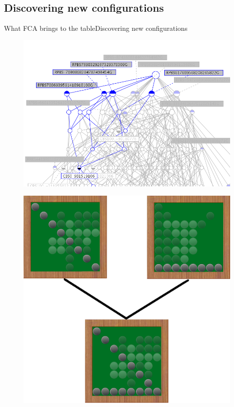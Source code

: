 \subsection{Discovering new configurations}
\begin{frame}{What FCA brings to the table}{Discovering new
    configurations}

\begin{minipage}[t]{0.40\linewidth}
  \begin{figure}[ht]
    \centering
    \includegraphics[width=\textwidth]{img/fca/common_part}
  \end{figure}
\end{minipage}
\begin{minipage}{0.50\linewidth}
  \begin{figure}[ht]
    \centering
    \includegraphics[width=\textwidth]{img/fca/fca_new_configuration}
  \end{figure}  

\end{minipage}

\end{frame}


